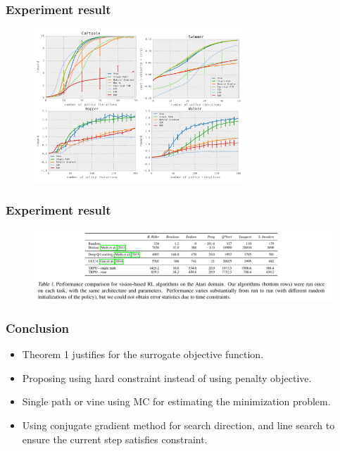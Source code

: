 \documentclass[9pt]{beamer}
\theoremstyle{remark}
\begin{document}
\begin{frame}
    \frametitle{Experiment result}
    \begin{figure}
        \centering
        \includegraphics[width=0.7\textwidth]{figures/result1.png}
    \end{figure}

\end{frame}

\begin{frame}
    \frametitle{Experiment result}
    \begin{figure}
        \centering
        \includegraphics[width=\textwidth]{figures/result2.png}
    \end{figure}
\end{frame}

\begin{frame}
    \frametitle{Conclusion}
    \begin{itemize}
        \item Theorem 1 justifies for the surrogate objective function.
        \item Proposing using hard constraint instead of using penalty objective.
        \item Single path or vine using MC for estimating the minimization problem.
        \item Using conjugate gradient method for search direction, and line search to ensure the current step satisfies constraint.
    \end{itemize}
\end{frame}
\end{document}

